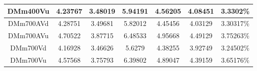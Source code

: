 \begin{table}[htdp]
\begin{center}
\begin{tabular}{|c|c|c|c|c|c|c|}
\hline
DMm400Vu & 4.23767 & 3.48019 & 5.94191 & 4.56205 & 4.08451 & 3.3302\%\\
\hline
DMm700AVd & 4.28751 & 3.49681 & 5.82012 & 4.45456 & 4.03129 & 3.30317\%\\
\hline
DMm700AVu & 4.70522 & 3.87715 & 6.48533 & 4.95668 & 4.49129 & 3.75263\%\\
\hline
DMm700Vd & 4.16928 & 3.46626 & 5.6279 & 4.38255 & 3.92749 & 3.24502\%\\
\hline
DMm700Vu & 4.57568 & 3.75793 & 6.39802 & 4.89047 & 4.39159 & 3.65176\%\\
\hline
\end{tabular}
\end{center}
\label{default}
\end{table}
